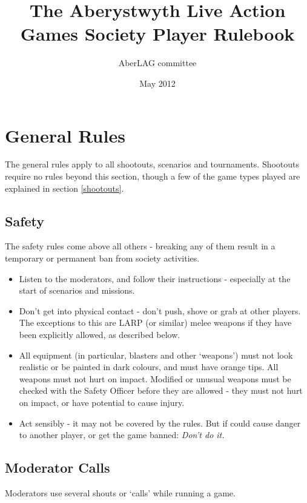 \documentclass{article}
\begin{document}
\title{The Aberystwyth Live Action Games Society Player Rulebook}
\author{AberLAG committee}
\date{May 2012}
\maketitle{}

\tableofcontents
\newpage

\section{General Rules}
	The general rules apply to all shootouts, scenarios and tournaments. Shootouts require no rules beyond this section, though a few of the game types played are explained in section \ref{shootouts}.

	\subsection{Safety}
		The safety rules come above all others - breaking any of them result in a temporary or permanent ban from society activities.
		
		\begin{itemize}
			\item Listen to the moderators, and follow their instructions - especially at the start of scenarios and missions.
			
			\item Don't get into physical contact - don't push, shove or grab at other players. The exceptions to this are LARP (or similar) melee weapons if they have been explicitly allowed, as described below.
			
			\item All equipment (in particular, blasters and other `weapons') must not look realistic or be painted in dark colours, and must have orange tips. All weapons must not hurt on impact. Modified or unusual weapons must be checked with the Safety Officer before they are allowed - they must not hurt on impact, or have potential to cause injury.
			
			\item Act sensibly - it may not be covered by the rules. But if could cause danger to another player, or get the game banned: {\em Don't do it.}
		\end{itemize}
	
	\subsection{Moderator Calls}
		Moderators use several shouts or `calls' while running a game.
	
\end{document}
